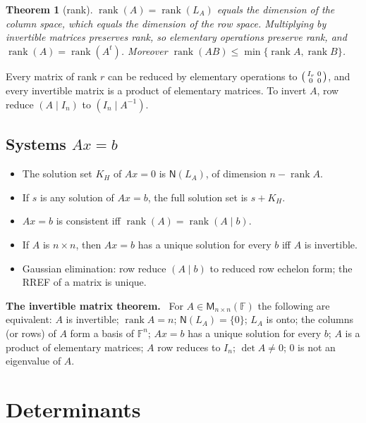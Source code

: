 \documentclass[12pt]{article}
\newtheorem{theorem}{Theorem}[section]
\theoremstyle{definition}
\theoremstyle{remark}
\newenvironment{fact}[1]{\par\noindent\textbf{#1.}\ }{\par}
\newcommand{\F}{\mathbb{F}}
\newcommand{\N}{\mathsf{N}}
\newcommand{\M}{\mathsf{M}}
\DeclareMathOperator{\rank}{rank}
\renewcommand{\det}{\operatorname{det}}
\begin{document}
\begin{theorem}[rank]
$\rank(A)=\rank(L_A)$ equals the dimension of the column space, which equals the dimension of the row space.
Multiplying by invertible matrices preserves rank, so elementary operations preserve rank, and
$\rank(A)=\rank(A^t)$. Moreover $\rank(AB)\le\min\{\rank A,\rank B\}$.
\end{theorem}

Every matrix of rank $r$ can be reduced by elementary operations to $\begin{psmallmatrix} I_r & 0\\ 0& 0\end{psmallmatrix}$, and
every invertible matrix is a product of elementary matrices.
To invert $A$, row reduce $(A\mid I_n)$ to $(I_n\mid A^{-1})$.

\subsection{Systems $Ax=b$}
\begin{itemize}
  \item The solution set $K_H$ of $Ax=0$ is $\N(L_A)$, of dimension $n-\rank A$.
  \item If $s$ is any solution of $Ax=b$, the full solution set is $s+K_H$.
  \item $Ax=b$ is consistent iff $\rank(A)=\rank(A\mid b)$.
  \item If $A$ is $n\times n$, then $Ax=b$ has a unique solution for every $b$ iff $A$ is invertible.
  \item Gaussian elimination: row reduce $(A\mid b)$ to reduced row echelon form; the RREF of a matrix is unique.
\end{itemize}

\begin{fact}{The invertible matrix theorem}
For $A\in\M_{n\times n}(\F)$ the following are equivalent:
$A$ is invertible; $\rank A=n$; $\N(L_A)=\{0\}$; $L_A$ is onto; the columns (or rows) of $A$ form a basis of $\F^n$;
$Ax=b$ has a unique solution for every $b$; $A$ is a product of elementary matrices; $A$ row reduces to $I_n$;
$\det A\neq 0$; $0$ is not an eigenvalue of $A$.
\end{fact}

\section{Determinants}
\end{document}
